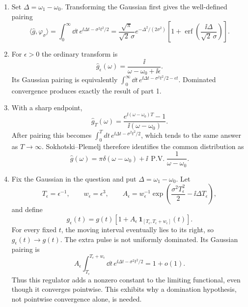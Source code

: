 \begin{enumerate}
\begin{enumerate}
\item
Set \(\Delta=\omega_1-\omega_0\).  Transforming the Gaussian first
gives the well-defined pairing
\[
 \langle\widehat g,\varphi_\sigma\rangle
 =\int_0^\infty \dd t\,e^{\ii\Delta t-\sigma^2t^2/2}
 =\frac{\sqrt\pi}{\sqrt2\,\sigma}e^{-\Delta^2/(2\sigma^2)}
 \left[1+\operatorname{erf}
 \left(\frac{\ii\Delta}{\sqrt2\,\sigma}\right)\right].
\]
\item
For \(\epsilon>0\) the ordinary transform is
\[
 \widehat g_\epsilon(\omega)
 =\frac{\ii}{\omega-\omega_0+\ii\epsilon}.
\]
Its Gaussian pairing is equivalently
\(\int_0^\infty \dd t\,e^{\ii\Delta t-\sigma^2t^2/2-\epsilon t}\).
Dominated convergence produces exactly the result of part 1.
\item
With a sharp endpoint,
\[
 \widehat g_T(\omega)
 =\frac{e^{\ii(\omega-\omega_0)T}-1}{\ii(\omega-\omega_0)}.
\]
After pairing this becomes
\(\int_0^Tdt\,e^{\ii\Delta t-\sigma^2t^2/2}\), which tends to the same
answer as \(T\to\infty\).  Sokhotski--Plemelj therefore identifies the
common distribution as
\[
 \widehat g(\omega)=\pi\delta(\omega-\omega_0)
 +\ii\,\operatorname{P.V.}\frac1{\omega-\omega_0}.
\]
\item
Fix the Gaussian in the question and put
\(\Delta=\omega_1-\omega_0\).  Let
\[
 T_\epsilon=\epsilon^{-1},\qquad w_\epsilon=\epsilon^3,\qquad
 A_\epsilon=w_\epsilon^{-1}
 \exp\!\left(\frac{\sigma^2T_\epsilon^2}{2}-\ii\Delta T_\epsilon\right),
\]
and define
\[
 g_\epsilon(t)=g(t)\left[
 1+A_\epsilon\,
 \mathbf 1_{[T_\epsilon,T_\epsilon+w_\epsilon]}(t)\right].
\]
For every fixed \(t\), the moving interval eventually lies to its right,
so \(g_\epsilon(t)\to g(t)\).  The extra pulse is not uniformly
dominated.  Its Gaussian pairing is
\[
 A_\epsilon\int_{T_\epsilon}^{T_\epsilon+w_\epsilon}
 \dd t\,e^{\ii\Delta t-\sigma^2t^2/2}=1+o(1).
\]
Thus this regulator adds a nonzero constant to the limiting functional,
even though it converges pointwise.  This exhibits why a domination
hypothesis, not pointwise convergence alone, is needed.
\end{enumerate}


\end{enumerate}
